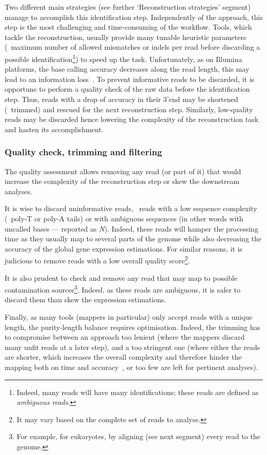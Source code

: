 Two different main strategies (see further `Reconstruction strategies' segment)
manage to accomplish this identification step. Independently of the
approach, this step is the most challenging and time-consuming
of the workflow. Tools, which tackle the reconstruction, usually provide
many tunable heuristic parameters (\eg\ maximum number of allowed mismatches
or indels per read before discarding a possible identification\footnote{Indeed,
many reads will have many identifications; these reads are defined as
\emph{ambiguous reads}.})
to speed up the task.
Unfortunately, as on Illumina platforms, the base calling accuracy decreases
along the read length, this may lead to an information loss~.
To prevent informative reads to be discarded, it is opportune to perform a quality
check of the raw data before the identification step. Thus, reads with a drop of
accuracy in their 3'end may be shortened (\ie\ trimmed) and rescued for the next
reconstruction step. Similarly, low-quality reads may be discarded hence
lowering the complexity
of the reconstruction task and hasten its accomplishment.

\subsubsection{Quality check, trimming and filtering}\label{subsub:trim}

The quality assessment allows removing any read (or part of it) that would
increase the complexity of the reconstruction step or skew the downstream analyses.

It is wise to discard uninformative reads, \ie\ reads with a low sequence
complexity (\eg\ poly-T or poly-A tails) or with ambiguous sequences (in other
words with uncalled bases --- reported as \emph{N}).
Indeed, these reads will hamper the processing time as they
usually map to several parts of the genome while also decreasing the accuracy of
the global gene expression estimations.
For similar reasons, it is judicious to remove reads with a low overall quality
score\footnote{It may vary based on the complete set of reads to analyse.}.

It is also prudent to check and remove any read that may map to possible
contamination sources\footnote{For example, for eukaryotes, by aligning (see next
segment) every read to the  genome.}.
Indeed, as these reads are ambiguous, it is safer
to discard them than skew the expression estimations.

Finally, as many tools (mappers in particular) only accept reads
with a unique length, the purity-length balance requires optimisation.
Indeed, the trimming has to compromise between
an approach too lenient (where the mappers discard many unfit reads at a later step),
and
a too stringent one (where either the reads are shorter,
which increases the overall complexity and therefore hinder
the mapping both on time and accuracy~,
or too few are left for pertinent analyses).

